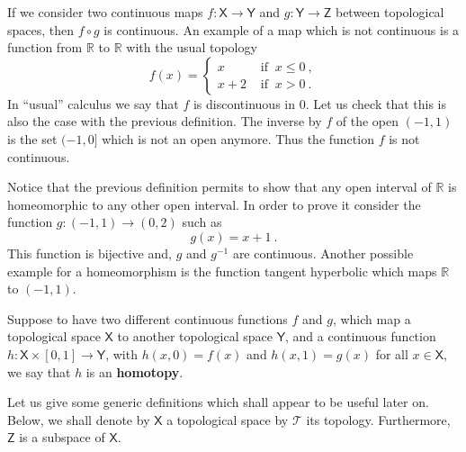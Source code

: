 \documentclass[11pt]{book}
\newcommand{\Tcal}{\mathcal{T}}
\newcommand{\Rbb}{\mathbb{R}}
\newcommand{\Xsf}{\mathsf{X}}
\newcommand{\Ysf}{\mathsf{Y}}
\newcommand{\Zsf}{\mathsf{Z}}
\theoremstyle{break}
\begin{document}
If we consider two continuous maps $f : \Xsf \to \Ysf$ and $g : \Ysf \to \Zsf$ between topological spaces, then $f \circ g$ is continuous. An example of a map which is not continuous is a function from $\Rbb$ to $\Rbb$ with the usual topology
%
\begin{equation*}
f(x) = \left\{
\begin{array}{ll}
x & \mbox{ if } \ x \leq 0 \ , \\
x + 2 & \mbox{ if } \ x > 0 \ .
\end{array}
\right.
\end{equation*}
%
In ``usual'' calculus we say that $f$ is discontinuous in $0$. Let us check that this is also the case with the previous definition. The inverse by $f$ of the open $(-1,1)$ is the set $(-1,0]$ which is not an open anymore. Thus the function $f$ is not continuous.


Notice that the previous definition permits to show that any open interval of $\Rbb$ is homeomorphic to any other open interval. In order to prove it consider the function $g : (-1,1) \to (0,2)$ such as
%
\begin{equation*}
g(x) = x + 1 \ . 
\end{equation*}
%
This function is bijective and, $g$ and $g^{-1}$ are continuous. Another possible example for a homeomorphism is the function tangent hyperbolic which maps $\Rbb$ to $(-1,1)$.


\bigskip


Suppose to have two different continuous functions $f$ and $g$, which map a topological space $\Xsf$ to another topological space $\Ysf$, and a continuous function $h : \Xsf \times [0,1] \to \Ysf$, with  $h(x,0) = f(x)$ and $h(x,1) = g(x)$ for all $x \in \Xsf$, we say that $h$ is an \textbf{homotopy}. 

\bigskip


Let us give some generic definitions which shall appear to be useful later on. Below, we shall denote by $\Xsf$ a topological space by $\Tcal$ its topology. Furthermore, $\Zsf$ is a subspace of $\Xsf$.
\end{document}
